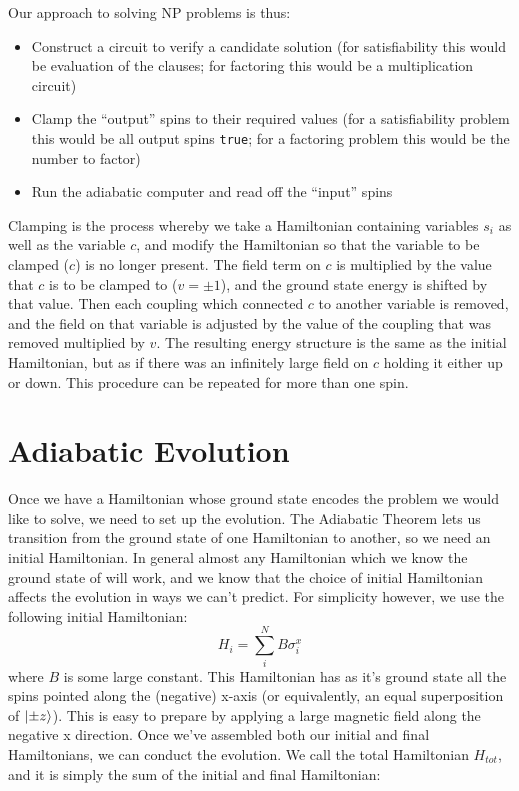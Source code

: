 Our approach to solving NP problems is thus:
\begin{itemize}
	\item Construct a circuit to verify a candidate solution (for satisfiability this would be evaluation of the clauses; for factoring this would be a multiplication circuit)
	\item Clamp the ``output'' spins to their required values (for a satisfiability problem this would be all output spins \texttt{true}; for a factoring problem this would be the number to factor)
	\item Run the adiabatic computer and read off the ``input'' spins
\end{itemize}

Clamping is the process whereby we take a Hamiltonian containing variables $s_i$ as well as the variable $c$, and modify the Hamiltonian so that the variable to be clamped ($c$) is no longer present.  The field term on $c$ is multiplied by the value that $c$ is to be clamped to ($v = \pm1$), and the ground state energy is shifted by that value.  Then each coupling which connected $c$ to another variable is removed, and the field on that variable is adjusted by the value of the coupling that was removed multiplied by $v$.  The resulting energy structure is the same as the initial Hamiltonian, but as if there was an infinitely large field on $c$ holding it either up or down.  This procedure can be repeated for more than one spin.

\section{Adiabatic Evolution}
Once we have a Hamiltonian whose ground state encodes the problem we would like to solve, we need to set up the evolution.  The Adiabatic Theorem lets us transition from the ground state of one Hamiltonian to another, so we need an initial Hamiltonian.  In general almost any Hamiltonian which we know the ground state of will work, and we know that the choice of initial Hamiltonian affects the evolution in ways we can't predict.  For simplicity however, we use the following initial Hamiltonian:
\begin{equation}
	H_i = \sum_i^N B \sigma_i^x
\end{equation}
where $B$ is some large constant.  This Hamiltonian has as it's ground state all the spins pointed along the (negative) x-axis (or equivalently, an equal superposition of $\mathinner{|{\pm z}\rangle}$).  This is easy to prepare by applying a large magnetic field along the negative x direction.
Once we've assembled both our initial and final Hamiltonians, we can conduct the evolution.  We call the total Hamiltonian $H_{tot}$, and it is simply the sum of the initial and final Hamiltonian:

